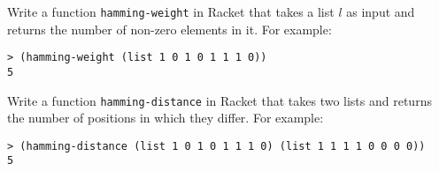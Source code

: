 \documentclass[a4paper, 12pt]{exam}
\begin{document}
\begin{questions}
\question
Write a function \texttt{hamming-weight} in Racket that takes a list $l$ as input and returns the number of non-zero elements in it.
For example:
\begin{verbatim}
> (hamming-weight (list 1 0 1 0 1 1 1 0))
5
\end{verbatim}

\question
Write a function \texttt{hamming-distance} in Racket that takes two lists and returns the number of positions in which they differ.
For example:
\begin{verbatim}
> (hamming-distance (list 1 0 1 0 1 1 1 0) (list 1 1 1 1 0 0 0 0))
5
\end{verbatim}


\end{questions}



\end{document}
